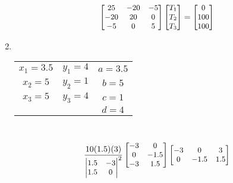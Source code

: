 \documentclass[10pt]{article}
\begin{document}
\begin{enumerate}
\begin{align*}
\end{align*}\\
\begin{align*}
\small{
\begin{bmatrix}
25 & -20 & -5\\
-20 & 20 & 0 \\
-5 & 0 & 5
\end{bmatrix}
\begin{bmatrix} 
T_1 \\ T_2 \\ T_3
\end{bmatrix} =  
\begin{bmatrix} 
0 \\ 100 \\ 100
\end{bmatrix}}
\end{align*}
\item\mbox{}\\
\begin{minipage}{0.5\textwidth}
\end{minipage}
\begin{minipage}{0.5\textwidth}
\begin{tabular}{ccc}
$x_1 = 3.5$ & $y_1 = 4$ & $a = 3.5 $\\
$x_2 = 5 $& $y_2 = 1$ & $b = 5 $\\
$x_3 = 5$ & $y_3 = 4$ & $c = 1 $ \\
 & & $d = 4$
\end{tabular}
\end{minipage} \\
\begin{align*}
\small{
\frac{10(1.5)(3)}
{\begin{vmatrix}
1.5 & -3 \\
1.5 & 0
\end{vmatrix}^2} 
\begin{bmatrix}
-3 & 0\\
 0 & -1.5 \\
 -3 & 1.5
\end{bmatrix} 
\begin{bmatrix}
-3 & 0 & 3 \\
0 & -1.5 & 1.5
\end{bmatrix} 
}
\end{align*}
\end{enumerate}
\end{document}
